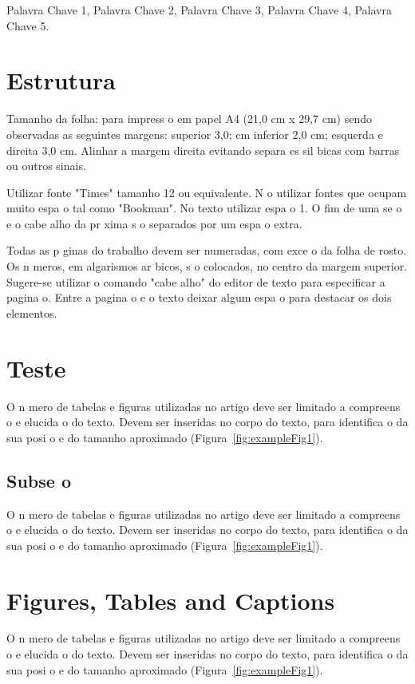 \documentclass{article}
\begin{document}
\begin{keywords}
    Palavra Chave 1, Palavra Chave 2, Palavra Chave 3, Palavra Chave 4, Palavra Chave 5.
\end{keywords}

\section{Estrutura}

Tamanho da folha: para  impress o em papel  A4 (21,0 cm x 29,7 cm) sendo observadas as seguintes margens: superior 3,0; cm inferior 2,0 cm; esquerda e direita 3,0 cm. Alinhar a margem direita evitando separa es sil bicas com barras ou outros sinais.

Utilizar fonte "Times" tamanho 12 ou equivalente. N o utilizar fontes que ocupam muito espa o tal como "Bookman".  No texto utilizar espa o 1.  O fim de uma se o e o cabe alho da pr xima s o separados por um espa o extra.

Todas as p ginas do trabalho devem ser numeradas, com exce o da folha de rosto.  Os n meros, em algarismos ar bicos, s o colocados, no centro da margem superior. Sugere-se utilizar o comando "cabe alho" do editor de texto para especificar a pagina o. Entre a pagina o e o texto deixar algum espa o para destacar os dois elementos. 

\section{Teste}
O n mero de tabelas e figuras utilizadas no artigo deve ser limitado a compreens o e elucida o do texto. Devem ser inseridas no corpo do texto, para identifica o da sua posi o e do tamanho aproximado (Figura~\ref{fig:exampleFig1}).

\subsection{Subse o}
O n mero de tabelas e figuras utilizadas no artigo deve ser limitado a compreens o e elucida o do texto. Devem ser inseridas no corpo do texto, para identifica o da sua posi o e do tamanho aproximado (Figura~\ref{fig:exampleFig1}).

\section{Figures, Tables and Captions}\label{sec:figs}

O n mero de tabelas e figuras utilizadas no artigo deve ser limitado a compreens o e elucida o do texto. Devem ser inseridas no corpo do texto, para identifica o da sua posi o e do tamanho aproximado (Figura~\ref{fig:exampleFig1}).
\end{document}
